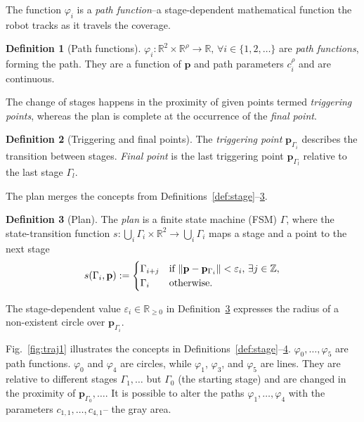 \documentclass[letterpaper,10pt,conference,twoside]{IEEEtran}
\DeclarePairedDelimiter\norm{\lVert}{\rVert}%
\theoremstyle{definition}
\newtheorem{defn}{Definition}[section]
\begin{document}
The function $\varphi_i$ is a \emph{path function}{\color{black}--a }%
stage-dependent mathematical function %
the %
robot tracks as it travels %
the coverage. 

\begin{defn}[Path functions]
  \label{def:paths}
  $\varphi_i:\mathbb{R}^2\times\mathbb{R}^\rho\rightarrow\mathbb{R},\,\forall i\in\{1,2,\dots\}
  $ are \emph{path functions}, forming the path. They are a function of {\color{black}$\mathbf{p}%
  $} and path parameters $c_i^\rho%
  $ and are continuous.%
\end{defn}

The change of stages happens in the proximity of given points termed \emph{triggering points}, whereas the plan is complete at the occurrence of the \emph{final point}.

\begin{defn}[Triggering and final points]
  \label{def:trigs}
  The \emph{triggering point} $\mathbf{p}_{\Gamma_{i}}$ describes the transition between stages. \emph{Final point} is the last triggering point $\mathbf{p}_{\Gamma_{l}}$ relative to the last stage $\Gamma_l$.
\end{defn}

The plan merges the concepts from Definitions~\ref{def:stage}--\hyperref[def:trigs]{3}. %

\begin{defn}[Plan]\label{def:plan}
  The \emph{plan} is a finite state machine (FSM) $\Gamma$, where the state-transition function $s:\bigcup_i{\Gamma_i}\times\mathbb{R}^2\rightarrow\bigcup_i{\Gamma_i}$ maps a stage and a point to the next stage
  \begin{equation*}{\color{black}s(\Gamma_i,\mathbf{p}%
    )}:=\begin{cases}
    \Gamma_{i+j} & {\color{black}\text{if }\norm{\mathbf{p}%
    -\mathbf{p}_{\Gamma_i}}<\varepsilon_i,\,\exists j\in\mathbb{Z},}\\
    \Gamma_i & \text{otherwise}.
  \end{cases}\end{equation*}
\end{defn}

The stage-dependent value $\varepsilon_i\in\mathbb{R}_{\geq 0}$ in Definition~\ref{def:plan} expresses the radius of a non-existent circle over $\mathbf{p}_{\Gamma_i}$.

Fig.~\ref{fig:traj1} illustrates the concepts in Definitions~\ref{def:stage}--\hyperref[def:plan]{4}. $\varphi_0,\dots,\varphi_5$ are path functions. $\varphi_0$ and $\varphi_4$ are circles, while $\varphi_1$, $\varphi_3$, and $\varphi_5$ are lines. They are relative to different stages $\Gamma_1,\dots$ but $\Gamma_0$ (the starting stage) and are changed in the proximity of $\mathbf{p}_{\Gamma_0},\dots$. %
It is possible to alter the paths $\varphi_1,\dots,\varphi_4$ with the parameters $c_{1,1},\dots,c_{4,1}$--%
the gray area.%
\end{document}
